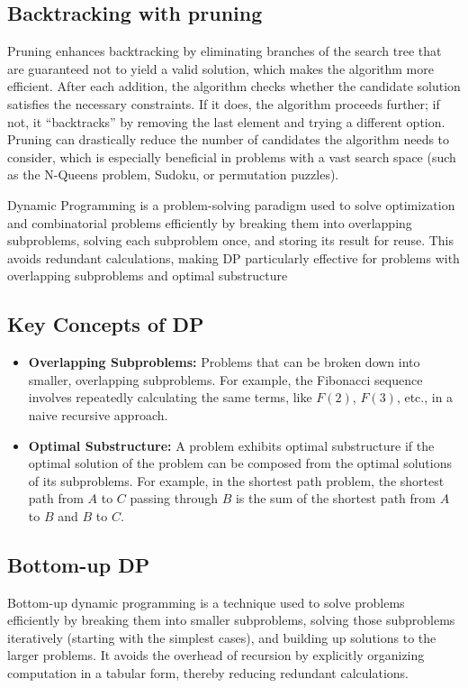 \documentclass{report}
\begin{document}
\pagebreak 
\subsection{Backtracking with pruning}
\bigbreak \noindent 
Pruning enhances backtracking by eliminating branches of the search tree that are guaranteed not to yield a valid solution, which makes the algorithm more efficient.
\bigbreak \noindent 
After each addition, the algorithm checks whether the candidate solution satisfies the necessary constraints. If it does, the algorithm proceeds further; if not, it “backtracks” by removing the last element and trying a different option.
\bigbreak \noindent 
Pruning can drastically reduce the number of candidates the algorithm needs to consider, which is especially beneficial in problems with a vast search space (such as the N-Queens problem, Sudoku, or permutation puzzles).










\pagebreak 
{}
\bigbreak \noindent 
Dynamic Programming is a problem-solving paradigm used to solve optimization and combinatorial problems efficiently by breaking them into overlapping subproblems, solving each subproblem once, and storing its result for reuse. This avoids redundant calculations, making DP particularly effective for problems with overlapping subproblems and optimal substructure
\subsection{Key Concepts of DP}
\bigbreak \noindent 
\begin{itemize}
    \item \textbf{Overlapping Subproblems:} Problems that can be broken down into smaller, overlapping subproblems. For example, the Fibonacci sequence involves repeatedly calculating the same terms, like $F(2)$, $F(3)$, etc., in a naive recursive approach.
    \item \textbf{Optimal Substructure:} A problem exhibits optimal substructure if the optimal solution of the problem can be composed from the optimal solutions of its subproblems. For example, in the shortest path problem, the shortest path from $A$ to $C$ passing through $B$ is the sum of the shortest path from $A$ to $B$ and $B$ to $C$.
\end{itemize}
\bigbreak \noindent 
\subsection{Bottom-up DP}
\bigbreak \noindent 
Bottom-up dynamic programming is a technique used to solve problems efficiently by breaking them into smaller subproblems, solving those subproblems iteratively (starting with the simplest cases), and building up solutions to the larger problems. It avoids the overhead of recursion by explicitly organizing computation in a tabular form, thereby reducing redundant calculations.
\bigbreak \noindent 
\end{document}
